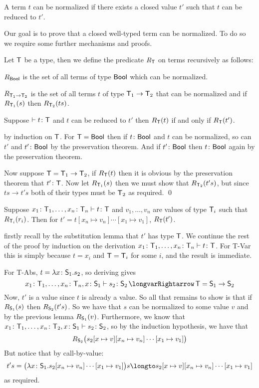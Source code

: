 \bdefn

    A term $t$ {\emphcolor can be normalized} if there exists a closed value $t'$ such that $t$ can be reduced to $t'$.

\edefn

Our goal is to prove that a closed well-typed term can be normalized.
To do so we require some further mechanisms and proofs.

\bdefn

    Let $\T$ be a type, then we define the predicate $R_\T$ on terms recursively as follows:
    \benum
        \item $R_{\sf Bool}$ is the set of all terms of type $\Bool$ which can be normalized.
        \item $R_{\T_1\to\T_2}$ is the set of all terms $t$ of type $\T_1\to\T_2$ that can be normalized and if $R_{\T_1}(s)$ then $R_{\T_2}(ts)$.
    \eenum

\edefn

\blemm

    Suppose $\vdash t\colon\T$ and $t$ can be reduced to $t'$ then $R_\T(t)$ if and only if $R_\T(t')$.

\elemm

\Proof by induction on $\T$.
For $\T={\sf Bool}$ then if $t\colon{\sf Bool}$ and $t$ can be normalized, so can $t'$ and $t'\colon{\sf Bool}$ by the preservation theorem.
And if $t'\colon{\sf Bool}$ then $t\colon{\sf Bool}$ again by the preservation theorem.

Now suppose $\T=\T_1\to\T_2$, if $R_\T(t)$ then it is obvious by the preservation theorem that $t'\colon\T$.
Now let $R_{\T_1}(s)$ then we must show that $R_{\T_2}(t's)$, but since $ts\to t's$ both of their types must be $\T_2$ as required.
\qed

\bcoro

    Suppose $x_1\colon\T_1,\dots,x_n\colon\T_n\vdash t\colon\T$ and $v_1,\dots,v_n$ are values of type $\T_i$ such that $R_{\T_i}(r_i)$.
    Then for $t'=t[x_n\mapsto v_n]\cdots[x_1\mapsto v_1]$, $R_\T(t')$.

\ecoro

\Proof firstly recall by the substitution lemma that $t'$ has type $\T$.
We continue the rest of the proof by induction on the derivation $x_1\colon\T_1,\dots,x_n\colon\T_n\vdash t\colon\T$.
For {\tensc T-Var} this is simply because $t=x_i$ and $\T=\T_i$ for some $i$, and the result is immediate.

For {\tensc T-Abs}, $t=\lambda x\colon\S_1.s_2$, so deriving gives
$$ x_1\colon\T_1,\dots,x_n\colon\T_n,x\colon\S_1\vdash s_2\colon\S_2\implies \T=\S_1\to\S_2 $$
Now, $t'$ is a value since $t$ is already a value.
So all that remains to show is that if $R_{\S_1}(s)$ then $R_{\S_2}(t's)$.
So we have that $s$ can be normalized to some value $v$ and by the previous lemma $R_{\S_1}(v)$.
Furthermore, we know that $x_1\colon\T_1,\dots,x_n\colon\T_2,x\colon\S_1\vdash s_2\colon\S_2$, so by the induction hypothesis, we have that
$$ R_{\S_2}\bigl(s_2[x\mapsto v][x_n\mapsto v_n]\cdots[x_1\mapsto v_1]\bigr) $$
But notice that by call-by-value:
$$ t's = \bigl(\lambda x\colon\S_1.s_2[x_n\mapsto v_n]\cdots[x_1\mapsto v_1]\bigr)s \longto s_2[x\mapsto v][x_n\mapsto v_n]\cdots[x_1\mapsto v_1] $$
as required.

